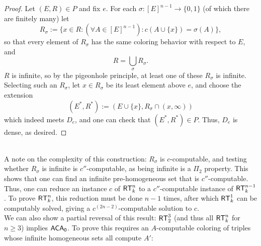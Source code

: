 \documentclass{amsart}
\begin{document}
\begin{proof}
		Let $(E,R)\in P$ and fix $e$. For each $\sigma:[E]^{n-1}\to \{0,1\}$ (of which there are finitely many) let
		$$
		R_{\sigma} := \{x\in R : (\forall A\in [E]^{n-1}):c(A\cup \{x\}) = \sigma(A)\},
		$$
		so that every element of $R_{\sigma}$ has the same coloring behavior with respect to $E$, and
		$$
		R = \bigcup_{\sigma} R_{\sigma}.
		$$
		$R$ is infinite, so by the pigeonhole principle, at least one of these $R_{\sigma}$ is infinite. Selecting such an $R_{\sigma}$, let $x\in R_{\sigma}$ be its least element above $e$, and choose the extension
		$$
		(E^*,R^*) := (E\cup \{x\},R_{\sigma} \cap (x,\infty))
		$$
		which indeed meets $D_e$, and one can check that $(E^*,R^*)\in P$. Thus, $D_e$ is dense, as desired.
	\end{proof}\\
	
	A note on the complexity of this construction: $R_{\sigma}$ is $c$-computable, and testing whether $R_{\sigma}$ is infinite is $c''$-computable, as being infinite is a $\Pi_2$ property. This shows that one can find an infinite pre-homogeneous set that is $c''$-computable. Thus, one can reduce an instance $c$ of $\operatorname{\sf{RT}}^n_k$ to a $c''$-computable instance of $\operatorname{\sf{RT}}^{n-1}_k$. To prove $\operatorname{\sf{RT}}^n_k$, this reduction must be done $n-1$ times, after which $\operatorname{\sf{RT}}^1_k$ can be computably solved, giving a $c^{(2n-2)}$-computable solution to $c$.\\
	
	We can also show a partial reversal of this result: $\operatorname{\sf{RT}}^3_2$ (and thus all $\operatorname{\sf{RT}}^n_k$ for $n\geq 3$) implies $\operatorname{\sf{ACA_0}}$. To prove this requires an $A$-computable coloring of triples whose infinite homogeneous sets all compute $A'$:\\
	
\end{document}
